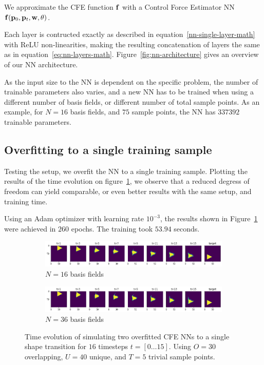 We approximate the \ac{CFE} function $\vb{f}$ with a Control Force Estimator
\acf{NN} $\vb{f}(\vb{p}_0, \vb{p}_t, \vb{w}, \vb{\theta})$. 

Each layer is contructed exactly as described in
equation~\eqref{nn-single-layer-math} with ReLU non-linearities, making the
resulting concatenation of layers the same as in
equation~\eqref{eq:nn-layers-math}. Figure~\ref{fig:nn-architecture} gives an
overview of our \ac{NN} architecture. 



As the input size to the \ac{NN} is dependent on the specific problem, the
number of trainable parameters also varies, and a new \ac{NN} has to be trained
when using a different number of basis fields, or different number of total
sample points. As an example, for $N=16$ basis fields, and $75$ sample points,
the \ac{NN} has $337 392$ trainable parameters.

\subsection*{Overfitting to a single training sample}
Testing the setup, we overfit the \ac{NN} to a single training sample. Plotting
the results of the time evolution on figure~\ref{fig:NN-overfit}, we observe
that a reduced degress of freedom can yield comparable, or even better results
with the same setup, and training time. 

Using an Adam \cite{adam} optimizer with learning rate $10^{-3}$, the results
shown in Figure~\ref{fig:NN-overfit} were achieved in $260$ epochs. The
training took $53.94$ seconds.

\begin{figure}
  \centering
  \begin{subfigure}{\textwidth}
    \centering
    \includegraphics[width=\textwidth]{figures/nn-training/NN_N16_triangle_overfit_horizontal.png}
    \caption{$N=16$ basis fields}
  \end{subfigure}
  \begin{subfigure}{\textwidth}
    \centering
    \includegraphics[width=\textwidth]{figures/nn-training/NN_N36_triangle_overfit_horizontal.png}
    \caption{$N=36$ basis fields}
  \end{subfigure}
  \caption{Time evolution of simulating two overfitted \ac{CFE} \acp{NN} to
  a single shape transition for $16$ timesteps $t=[0\dots15]$. Using $O=30$
overlapping, $U=40$ unique, and $T=5$  trivial sample points.}
  \label{fig:NN-overfit}
\end{figure}


